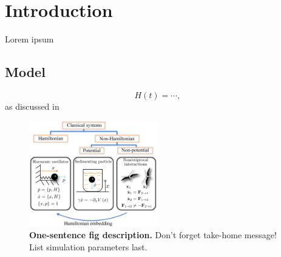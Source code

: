 \documentclass[
aps,
prx,
showpacs,
preprintnumbers,
twocolumn,
superscriptaddress,
10pt,
]{revtex4-2}
\newcommand*{\nqdcolor}{\color{nqdcolor}}
\newcommand{\nocontentsline}[3]{}
\newcommand\stoptoc{\let\addcontentsline\nocontentsline}
\begin{document}
\author{Master Yoda}
\author{Marin Bukov}

\clearpage
\title{\nqdcolor{Star Wars}} 

\ifmainmode

\begin{abstract}
		Some abstract
\end{abstract}

\maketitle
	
\stoptoc
\section{Introduction}

Lorem ipsum~\cite{dadhichi2020nonmutual}

\subsection{Model}

\begin{equation}
	H(t) = \cdots ,
\end{equation}
as discussed in~\cite{SI_ref}

\begin{figure}[t!]
	\centering
	\includegraphics[width=0.5\textwidth]{./fig-01/my_fig.pdf}
	\caption{
		\textbf{One-sentence fig description.}
		Don't forget take-home message!
		List simulation parameters last. 
	}  
	\label{fig:intro}
\end{figure}
\end{document}
